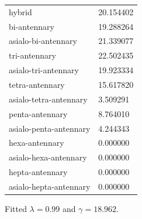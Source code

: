 \begin{table}[!htb]
\begin{threeparttable}
\begin{tabular}{l l}
                hybrid & 20.154402 \\
                bi-antennary & 19.288264 \\
                asialo-bi-antennary & 21.339077 \\
                tri-antennary & 22.502435 \\
                asialo-tri-antennary & 19.923334 \\
                tetra-antennary & 15.617820 \\
                asialo-tetra-antennary & 3.509291 \\
                penta-antennary & 8.764010 \\
                asialo-penta-antennary & 4.244343 \\
                hexa-antennary & 0.000000 \\
                asialo-hexa-antennary & 0.000000 \\
                hepta-antennary & 0.000000 \\
                asialo-hepta-antennary & 0.000000 \\
                \bottomrule
            \end{tabular}
            \begin{tablenotes}[normal]
                \item Fitted $\lambda = 0.99$ and $\gamma = 18.962$.
            \end{tablenotes}
        \end{threeparttable}
    \end{table}

